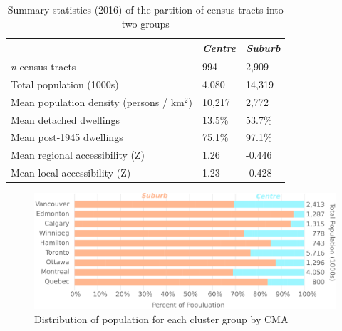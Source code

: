 \begin{table}[h]
	\small
	\centering
	\caption{{Summary statistics (2016) of the partition of census tracts into two groups}}
	\label{table:k2}
	\begin{tabular}{lll}
		\hline
		& \textit{Centre}    & \textit{Suburb}   \\ \hline
		\textit{n} census tracts   & 994     & 2,909     \\
		Total population (1000s)         & 4,080   & 14,319 \\
		Mean population density (persons / km$^2$)        & 10,217   & 2,772     \\
		Mean detached dwellings         & 13.5\%   & 53.7\%    \\
		Mean post-1945 dwellings           &  75.1\%       &  97.1\%        \\
		Mean regional accessibility (Z) & 1.26    & -0.446   \\
		Mean local accessibility (Z)    & 1.23    & -0.428   \\
		\hline
	\end{tabular}
\end{table}

\begin{figure}[h]
	\setlength{\fboxsep}{0pt}%
	\setlength{\fboxrule}{0pt}%
	\begin{center}
		\centering
		\includegraphics[width=5in]{figures/cluster_by_city.png}
	\end{center}
	\caption{Distribution of population for each cluster group by CMA}
	\label{kcma}
\end{figure}



